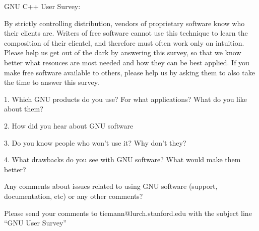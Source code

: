 GNU C++ User Survey:

By strictly controlling distribution, vendors of proprietary software
know who their clients are.  Writers of free software cannot use this
technique to learn the composition of their clientel, and therefore
must often work only on intuition.  Please help us get out of the dark
by answering this survey, so that we know better what resouces are
most needed and how they can be best applied.  If you make free
software available to others, please help us by asking them to also
take the time to answer this survey.

	1. Which GNU products do you use?  For what applications?
	   What do you like about them?

	2. How did you hear about GNU software

	3. Do you know people who won't use it?
	   Why don't they?

	4. What drawbacks do you see with GNU software?
	   What would make them better?

Any comments about issues related to using GNU software (support,
documentation, etc) or any other comments?  

Please send your comments to tiemann@lurch.stanford.edu with the
subject line ``GNU User Survey''

